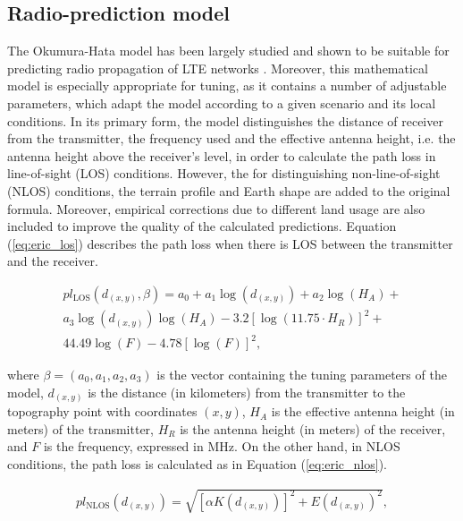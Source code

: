 \subsection{Radio-prediction model\label{sub:Radio-prediction-model}}

The Okumura-Hata model has been largely studied and shown to be suitable
for predicting radio propagation of LTE networks \cite{Ahmad:Studying_different_propagation_models_for_LTE_system:2012}.
Moreover, this mathematical model is especially appropriate for tuning,
as it contains a number of adjustable parameters, which adapt the
model according to a given scenario and its local conditions. In its
primary form, the model distinguishes the distance of receiver from
the transmitter, the frequency used and the effective antenna height,
i.e. the antenna height above the receiver's level, in order to calculate
the path loss in line-of-sight (LOS) conditions. However, the for
distinguishing non-line-of-sight (NLOS) conditions, the terrain profile
and Earth shape are added to the original formula. Moreover, empirical
corrections due to different land usage are also included to improve
the quality of the calculated predictions. Equation (\ref{eq:eric_los})
describes the path loss when there is LOS between the transmitter
and the receiver. 

\begin{multline}
pl_{\mathrm{LOS}}(d_{(x,y)},\beta)=a_{0}+a_{1}\log(d_{(x,y)})+a_{2}\log(H_{A})+\\
a_{3}\log(d_{(x,y)})\log(H_{A})-3.2\left[\log(11.75\cdot H_{R})\right]^{2}+\\
44.49\log(F)-4.78\left[\log(F)\right]^{2},\label{eq:eric_los}
\end{multline}


\noindent where $\beta=(a_{0},a_{1},a_{2},a_{3})$ is the vector containing
the tuning parameters of the model, $d_{(x,y)}$ is the distance (in
kilometers) from the transmitter to the topography point with coordinates
$(x,y)$, $H_{A}$ is the effective antenna height (in meters) of
the transmitter, $H_{R}$ is the antenna height (in meters) of the
receiver, and $F$ is the frequency, expressed in MHz. On the other
hand, in NLOS conditions, the path loss is calculated as in Equation
(\ref{eq:eric_nlos}).

\begin{multline}
pl_{\mathrm{NLOS}}(d_{(x,y)})=\sqrt{\left[\alpha K(d_{(x,y)})\right]^{2}+E(d_{(x,y)})^{2}},\label{eq:eric_nlos}
\end{multline}


